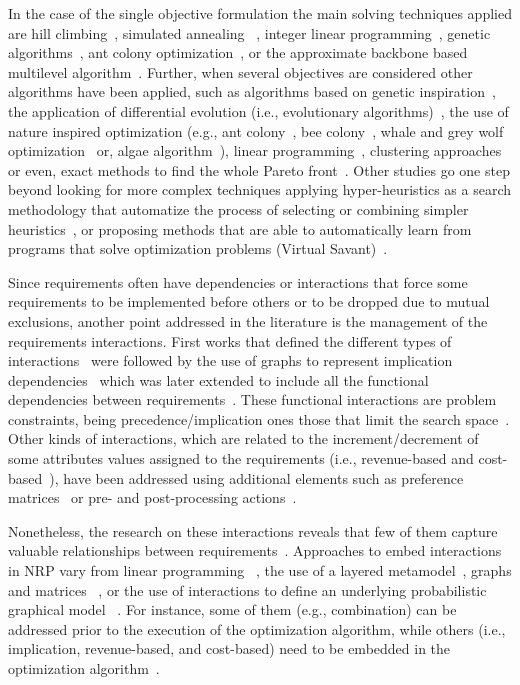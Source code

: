 In the case of the single objective formulation the main solving techniques applied are  hill climbing~\cite{bagnall2001}, simulated annealing ~\cite{bagnall2001,sagrado2011}, integer linear programming~\cite{bagnall2001,van2005}, genetic algorithms~\cite{greer2004}, ant colony optimization~\cite{sagrado2010,sagrado2011}, or the approximate backbone based multilevel algorithm~\cite{Xuan2012}. Further, when several objectives are considered other algorithms have been applied, such as  algorithms based on genetic inspiration~\cite{zhang2007,durillo2011}, the application of differential evolution (i.e., evolutionary algorithms)~\cite{chaves2015}, the use of nature inspired optimization  (e.g., ant colony~\cite{sagrado2015}, bee colony~\cite{alrezaamiri2020}, whale and grey wolf optimization~\cite{ghasemi2021} or, algae algorithm~\cite{piroz2021}),  linear programming~\cite{dominguez2019}, clustering approaches~\cite{sagrado2021,HUJAINAH2021} or even,  exact methods to find the whole Pareto front~\cite{DONG2022}. Other studies go one step beyond  looking for more complex techniques applying hyper-heuristics as a search methodology that  automatize the process of selecting or combining simpler heuristics~\cite{zhang2018}, or proposing methods that are able to automatically learn from programs that solve optimization problems (Virtual Savant)~\cite{massobrio2021}.
 
Since requirements often have dependencies or interactions that force some requirements to be implemented before others or to be dropped due to mutual exclusions, another point addressed  in the literature is the management of the requirements interactions. First works that defined the different types of interactions~\cite{karlsson1996, Carlshamre2001} were followed by the use of graphs to represent implication dependencies~\cite{ngo2004} which was later extended to include all the functional dependencies between requirements~\cite{sagrado2015}. 
These functional interactions are problem constraints, being precedence/implication ones those that limit the search space~\cite{sagrado2011}. Other kinds of interactions, which are related to the increment/decrement of some attributes values assigned to the requirements (i.e., revenue-based and cost-based~\cite{Carlshamre2001}), have been addressed  using additional elements such as preference matrices~\cite{mougouei2021} or pre- and post-processing actions~\cite{sagrado2015}.

Nonetheless, the research on these interactions reveals that few of them capture valuable relationships between requirements~\cite{zhang2014}. Approaches to embed interactions in NRP vary from linear programming ~\cite{li2010,veerapen2015}, the use of a layered metamodel~\cite{aydemir2018}, graphs and matrices ~\cite{sagrado2015,sangwan2020,mougouei2021}, or the use of interactions to define an underlying probabilistic graphical model ~\cite{sagrado2023}. For instance, some of them (e.g., combination) can be addressed prior to the execution of the optimization algorithm, while others (i.e., implication, revenue-based, and cost-based) need to be embedded in the optimization algorithm~\cite{sagrado2015}.

